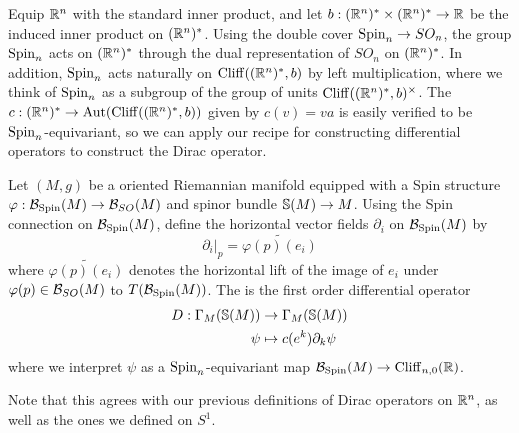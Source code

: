 Equip $\R^n$ with the standard inner product, and let
$b :(\R^n)^* \times (\R^n)^* \to \R$ be the induced inner product on $(\R^n)^*$.
Using the double cover $\Spin_n \to SO_n$, the group $\Spin_n$ acts on
$(\R^n)^*$ through the dual representation of $SO_n$ on $(\R^n)^*$. In addition,
$\Spin_n$ acts naturally on $\Cliff((\R^n)^*, b)$ by left multiplication, where
we think of $\Spin_n$ as a subgroup of the group of units
$\Cliff((\R^n)^*, b)^\times$. The 
$c : (\R^n)^* \to \Aut(\Cliff((\R^n)^*, b))$ given by $c(v) = va$ is easily
verified to be $\Spin_n$-equivariant, so we can apply our recipe for
constructing differential operators to construct the Dirac operator.
%
\begin{defn}
 Let $(M,g)$ be a oriented Riemannian manifold equipped with a Spin structure
 $\varphi : \B_{\Spin}(M) \to \B_{SO}(M)$ and spinor bundle $\S(M) \to M$.
 Using the Spin connection on $\B_{\Spin}(M)$, define the horizontal
 vector fields $\partial_i$ on $\B_{\Spin}(M)$ by
 \[
  \partial_i\vert_p = \widetilde{\varphi(p)(e_i)}
 \]
 where $\widetilde{\varphi(p)(e_i)}$ denotes the horizontal lift of the
 image of $e_i$ under $\varphi(p) \in \B_{SO}(M)$ to $T(\B_{\Spin}(M))$.
 The  is the first order differential operator
 \begin{align*}
  D : \Gamma_M(\S(M)) & \to \Gamma_M(\S(M))          \\
  \psi                & \mapsto c(e^k)\partial_k\psi
 \end{align*}
 where we interpret $\psi$ as a $\Spin_n$-equivariant map
 $\B_{\Spin}(M) \to \Cliff_{n,0}(\R)$.
\end{defn}
%
Note that this agrees with our previous definitions of Dirac operators on $\R^n$,
as well as the ones we defined on $S^1$.
\fi
%
